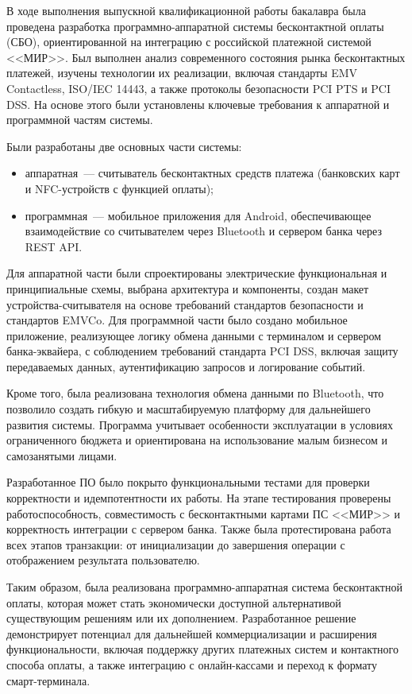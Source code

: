 \newpage


В ходе выполнения выпускной квалификационной работы бакалавра была проведена разработка программно-аппаратной системы бесконтактной оплаты (СБО), ориентированной на интеграцию с российской платежной системой <<МИР>>.
Был выполнен анализ современного состояния рынка бесконтактных платежей, изучены технологии их реализации, включая стандарты EMV Contactless, ISO/IEC 14443, а также протоколы безопасности PCI PTS и PCI DSS.
На основе этого были установлены ключевые требования к аппаратной и программной частям системы.

Были разработаны две основных части системы:
\begin{itemize}
    \item аппаратная~--- считыватель бесконтактных средств платежа (банковских карт и NFC-устройств с функцией оплаты);
    \item программная~--- мобильное приложения для Android, обеспечивающее взаимодействие со считывателем через Bluetooth и сервером банка через REST API.
\end{itemize}

Для аппаратной части были спроектированы электрические функциональная и принципиальные схемы, выбрана архитектура и компоненты, создан макет устройства-считывателя на основе требований стандартов безопасности и стандартов EMVCo.
Для программной части было создано мобильное приложение, реализующее логику обмена данными с терминалом и сервером банка-эквайера, с соблюдением требований стандарта PCI DSS, включая защиту передаваемых данных, аутентификацию запросов и логирование событий.

Кроме того, была реализована технология обмена данными по Bluetooth, что позволило создать гибкую и масштабируемую платформу для дальнейшего развития системы.
Программа учитывает особенности эксплуатации в условиях ограниченного бюджета и ориентирована на использование малым бизнесом и самозанятыми лицами.

Разработанное ПО было покрыто функциональными тестами для проверки корректности и идемпотентности их работы.
На этапе тестирования проверены работоспособность, совместимость с бесконтактными картами ПС <<МИР>> и корректность интеграции с сервером банка.
Также была протестирована работа всех этапов транзакции: от инициализации до завершения операции с отображением результата пользователю.

Таким образом, была  реализована программно-аппаратная система бесконтактной оплаты, которая может стать экономически доступной альтернативой существующим решениям или их дополнением.
Разработанное решение демонстрирует потенциал для дальнейшей коммерциализации и расширения функциональности, включая поддержку других платежных систем и контактного способа оплаты, а также интеграцию с онлайн-кассами и переход к формату смарт-терминала.
